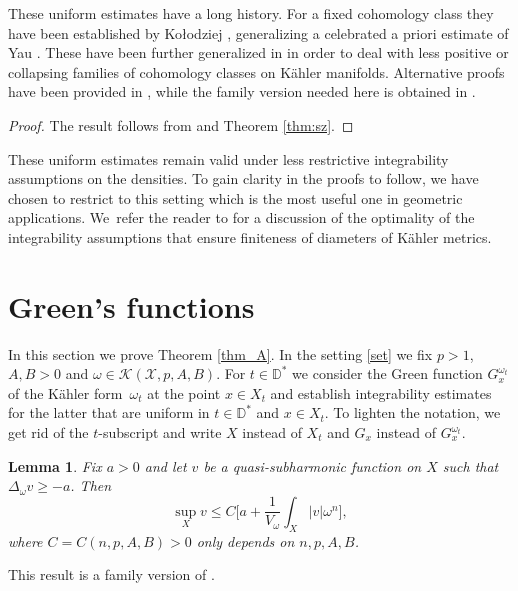 \documentclass[JEP,XML,SOM,Unicode,published]{cedram}
\newtheorem{lem}[theorem]{Lemma}
\theoremstyle{definition}
\begin{document}
These uniform estimates have a long history. For a fixed cohomology class they have been established by Ko{\l}odziej
\cite{Kol98}, generalizing a celebrated a priori estimate of Yau \cite{Yau78}.
These have been further generalized in \cite{EGZ09,EGZ08,DP10,BEGZ10} in order to deal with less positive or collapsing families of cohomology classes on Kähler manifolds. Alternative proofs have been provided in \cite{GL21,GPT23},
while the family version needed here is obtained in \cite{DnGG23}.

\begin{proof}
The result follows from \cite[Th.\,A]{DnGG23} and Theorem \ref{thm:sz}.
\end{proof}

These uniform estimates remain valid under less restrictive integrability assumptions on the densities.
To gain clarity in the proofs to follow, we have chosen to restrict to this setting which is the most useful one
in geometric applications. We~refer the reader to \cite[\S 5]{GGZ23} for a discussion of the optimality of the
integrability assumptions that ensure finiteness of diameters of Kähler metrics.

\section{Green's functions} \label{sec:uniformGreen}

In this section we prove Theorem \ref{thm_A}. In the setting \ref{set} we fix
$p>1$, $A,B>0$ and $\omega \in {\mathcal K}(\mathcal{X},p,A,B)$.
For $t \in {\mathbb D^*}$ we consider the Green function
$G^{\omega_t}_{x}$ of the Kähler form~$\omega_t$ at the point $x \in X_t$ and establish
integrability estimates for the latter that are uniform in $t \in {\mathbb D^*}$ and $x \in X_t$.
To lighten the notation, we get rid of the $t$-subscript and
write $X$ instead of $X_t$ and $G_x$ instead of $G^{\omega_t}_{x}$.


\begin{lem} \label{lem:5.1}
Fix $a>0$ and let $v$ be a quasi-subharmonic function on $X$ such that $\Delta_{\omega} v \geq -a$.
Then\vspace*{-3pt}
\[
\sup_X v \leq C \biggl[ a+ \frac{1}{V_{\omega}} \int_X |v| \omega^n \biggr],
\]
where $C=C(n,p,A,B)>0$ only depends on $n,p,A,B$.
\end{lem}

This result is a family version of \cite[Lem.\,5.1]{GPSS22}.
\end{document}
